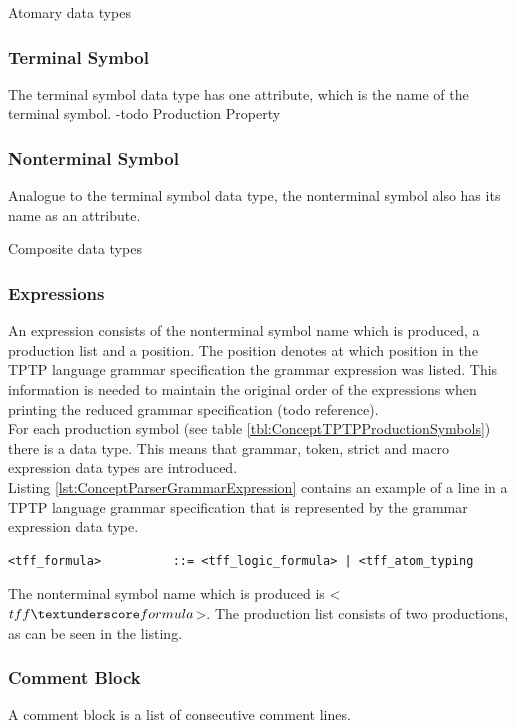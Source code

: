 Atomary data types

\subsubsection{Terminal Symbol}
The terminal symbol data type has one attribute, which is the name of the terminal symbol.
-todo Production Property

\subsubsection{Nonterminal Symbol}
Analogue to the terminal symbol data type, the nonterminal symbol also has its name as an attribute.

Composite data types

\subsubsection{Expressions}
An expression consists of the nonterminal symbol name which is produced, a production list and a position.
The position denotes at which position in the \ac{TPTP} language grammar specification the grammar expression was listed.
This information is needed to maintain the original order of the expressions when printing the reduced grammar specification (todo reference).\\
For each production symbol (see table \ref{tbl:ConceptTPTPProductionSymbols}) there is a data type. This means that grammar, token, strict and macro expression data types are introduced.\\
Listing \ref{lst:ConceptParserGrammarExpression} contains an example of a line in a \ac{TPTP} language grammar specification that is represented by the grammar expression data type.
\begin{lstlisting}[basicstyle=\scriptsize	,caption= Example of a grammar expression,label= lst:ConceptParserGrammarExpression]
<tff_formula>          ::= <tff_logic_formula> | <tff_atom_typing
\end{lstlisting}
The nonterminal symbol name which is produced is <$tff \textunderscore formula$>.  The production list consists of two productions, as can be seen in the listing.
\subsubsection{Comment Block}
A comment block is a list of consecutive comment lines.

